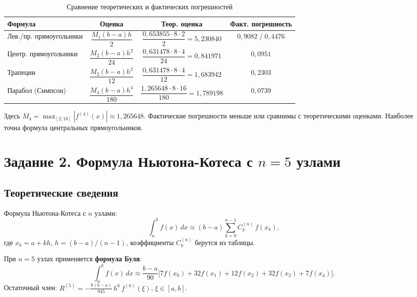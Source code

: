 \documentclass[a4paper, final]{article}
\begin{document}
\begin{table}[h!]
\centering
\caption{Сравнение теоретических и фактических погрешностей}
\label{tab:s1_err}
\renewcommand{\arraystretch}{1.4}
\small
\begin{tabular}{|l|c|c|c|}
\hline
Формула & Оценка & Теор. оценка & Факт. погрешность \\
\hline
Лев./пр. прямоугольники
  & $\dfrac{M_1(b-a)h}{2}$
  & $\dfrac{0{,}653855\cdot 8\cdot 2}{2} = 5{,}230840$
  & $0{,}9082\;/\;0{,}4476$ \\[8pt]
\hline
Центр. прямоугольники
  & $\dfrac{M_2(b-a)h^2}{24}$
  & $\dfrac{0{,}631478\cdot 8\cdot 4}{24} = 0{,}841971$
  & $0{,}0951$ \\[8pt]
\hline
Трапеции
  & $\dfrac{M_2(b-a)h^2}{12}$
  & $\dfrac{0{,}631478\cdot 8\cdot 4}{12} = 1{,}683942$
  & $0{,}2303$ \\[8pt]
\hline
Парабол (Симпсон)
  & $\dfrac{M_4(b-a)h^4}{180}$
  & $\dfrac{1{,}265648\cdot 8\cdot 16}{180} = 1{,}789198$
  & $0{,}0739$ \\[8pt]
\hline
\end{tabular}
\end{table}

Здесь $M_4 = \max_{[2;10]}|f^{(4)}(x)| \approx 1{,}265648$. 
Фактические погрешности меньше или сравнимы с теоретическими оценками.
Наиболее точна формула центральных прямоугольников.

\newpage

\section{Задание 2. Формула Ньютона-Котеса с $n = 5$ узлами}

\subsection{Теоретические сведения}

Формула Ньютона-Котеса с $n$ узлами:
\[
\int_a^b f(x)\,dx \approx (b-a)\sum_{k=0}^{n-1} C_k^{(n)}\,f(x_k),
\]
где $x_k = a + kh$, $h = (b-a)/(n-1)$, коэффициенты $C_k^{(n)}$ берутся из таблицы.

При $n = 5$ узлах применяется \textbf{формула Буля}:
\[
\int_a^b f(x)\,dx \approx \frac{b-a}{90}\bigl[7f(x_0)+32f(x_1)+12f(x_2)+32f(x_3)+7f(x_4)\bigr].
\]
Остаточный член: $\displaystyle R^{(5)} = -\frac{8(b-a)}{945}\,h^6\,f^{(6)}(\xi)$,
$\xi\in[a,b]$.
\end{document}
